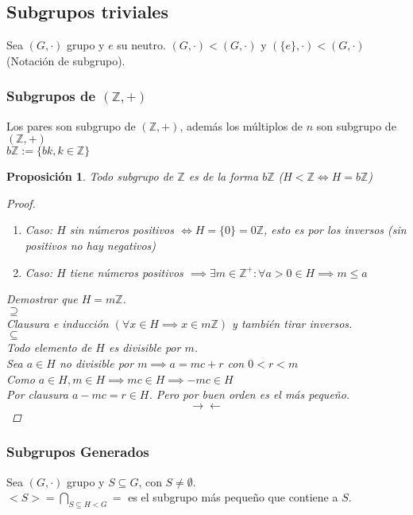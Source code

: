 \documentclass[11pt]{book}
\newtheorem{prop}[thm]{Proposición}
\theoremstyle{definition}
\begin{document}
\subsection{Subgrupos triviales}
Sea $(G,\cdot)$ grupo y $e$ su neutro. $(G,\cdot)<(G,\cdot)$ y $(\{e\},\cdot)<(G,\cdot)$ (Notación de subgrupo).
\subsubsection{Subgrupos de $(\mathbb{Z},+)$}
Los pares son subgrupo de $(\mathbb{Z},+)$, además los múltiplos de $n$ son subgrupo de $(\mathbb{Z},+)$\\
$b\mathbb{Z}:=\{bk,k\in\mathbb{Z}\}$
\begin{prop}
	Todo subgrupo de $\mathbb{Z}$ es de la forma $b\mathbb{Z}$ ($H<\mathbb{Z}\iff H=b\mathbb{Z}$)
	\begin{proof}
		\begin{enumerate}
			\item Caso: $H$ sin números positivos $\iff H=\{0\}=0\mathbb{Z}$, esto es por los inversos (sin positivos no hay negativos)
			
			\item Caso: $H$ tiene números positivos $\implies\exists m\in\mathbb{Z}^+:\forall a>0\in H\implies m\leq a$
		\end{enumerate}
		Demostrar que $H=m\mathbb{Z}$.\\
		$\supseteq$\\
		Clausura e inducción $(\forall x\in H\implies x\in m\mathbb{Z})$ y también tirar inversos.\\
		$\subseteq$\\
		Todo elemento de $H$ es divisible por $m$.\\
		Sea $a\in H$ no divisible por $m\implies a=mc+r$ con $0<r<m$\\
		Como $a\in H,m\in H\implies mc\in H\implies -mc\in H$\\
		Por clausura $a-mc=r\in H$. Pero por buen orden es el más pequeño.
		\[
		\rightarrow\leftarrow
		\]
	\end{proof}
\end{prop} 
\subsubsection{Subgrupos Generados}

Sea $(G,\cdot)$ grupo y $S\subseteq G$, con $S\neq\emptyset$.\\
$<S>=\bigcap _{S\subseteq H<G}=$ es el subgrupo más pequeño que contiene a $S$.
\end{document}
